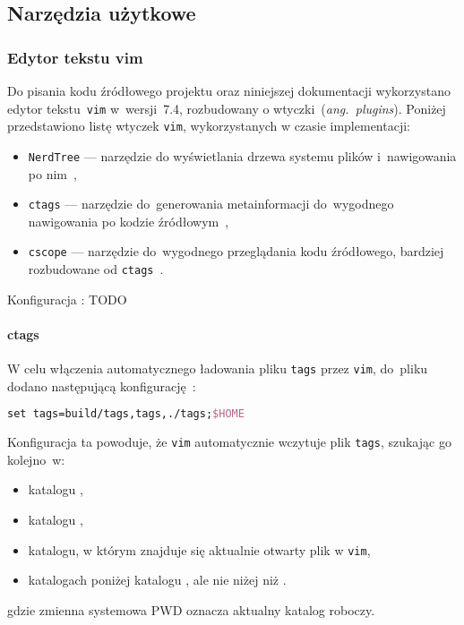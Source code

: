 \documentclass[thesis]{subfiles}
\begin{document}

\subsection{Narzędzia użytkowe}


\subsubsection{Edytor tekstu vim}

Do pisania kodu źródłowego projektu oraz niniejszej dokumentacji wykorzystano edytor tekstu~\texttt{vim} w~wersji~7.4, rozbudowany o wtyczki~(\emph{ang.~plugins}). Poniżej przedstawiono listę wtyczek \texttt{vim}, wykorzystanych w czasie implementacji:
\begin{itemize}
	\item\texttt{NerdTree} --- narzędzie do wyświetlania drzewa systemu plików i~nawigowania po nim~\cite{nerdtree-vimorg,nerdtree-github},
	\item\texttt{ctags} --- narzędzie do~generowania metainformacji do~wygodnego nawigowania po kodzie źródłowym~\cite{ctags},
	\item\texttt{cscope} --- narzędzie do~wygodnego przeglądania kodu źródłowego, bardziej rozbudowane od \texttt{ctags}~\cite{cscope}.
\end{itemize}

Konfiguracja :
TODO

\paragraph{ctags}

W celu włączenia automatycznego ładowania pliku \texttt{tags} przez \texttt{vim}, do~pliku \mbox{} dodano następującą konfigurację~\cite{ctags,ctags-tricks}:
\begin{lstlisting}[language=tex,numbers=none,caption={Konfiguracja \texttt{ctags} w~\texttt{.vimrc}}]
set tags=build/tags,tags,./tags;$HOME
\end{lstlisting}
Konfiguracja ta powoduje, że \texttt{vim} automatycznie wczytuje plik \texttt{tags}, szukając go kolejno~w:
\begin{itemize}[font=\ttfamily]
	\item katalogu ,
	\item katalogu ,
	\item katalogu, w którym znajduje się aktualnie otwarty plik w \texttt{vim},
	\item katalogach poniżej katalogu , ale nie niżej niż .
\end{itemize}
gdzie zmienna systemowa \gls{PWD} oznacza aktualny katalog roboczy.
\end{document}
